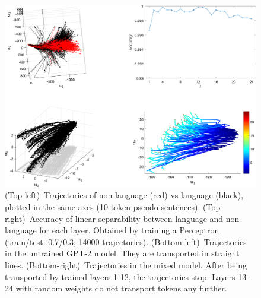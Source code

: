 \documentclass{article} %
\begin{document}
\begin{figure}[htbp]
\vskip 0.2in
\begin{center}
\centerline{\includegraphics[width=\columnwidth]{fig/figS_null_testing_v01.png}}
\caption{
(Top-left)~Trajectories of non-language (red) vs language (black), plotted in the same axes (10-token pseudo-sentences).
(Top-right)~Accuracy of linear separability between language and non-language for each layer. Obtained by training a Perceptron (train/test: 0.7/0.3; 14000 trajectories).
(Bottom-left)~Trajectories in the untrained GPT-2 model. They are transported in straight lines.
(Bottom-right)~Trajectories in the mixed model. After being transported by trained layers 1-12, the trajectories stop. Layers 13-24 with random weights do not transport tokens any further.
}
\label{fig:null-testing}
\end{center}
\vskip -0.2in
\end{figure}


\end{document}
